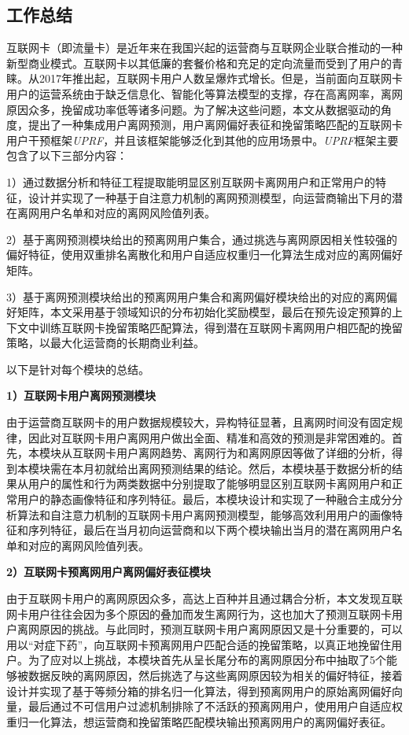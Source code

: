 \subsection{工作总结}
互联网卡（即流量卡）是近年来在我国兴起的运营商与互联网企业联合推动的一种新型商业模式。互联网卡以其低廉的套餐价格和充足的定向流量而受到了用户的青睐。从2017年推出起，互联网卡用户人数呈爆炸式增长。但是，当前面向互联网卡用户的运营系统由于缺乏信息化、智能化等算法模型的支撑，存在高离网率，离网原因众多，挽留成功率低等诸多问题。为了解决这些问题，本文从数据驱动的角度，提出了一种集成用户离网预测，用户离网偏好表征和挽留策略匹配的互联网卡用户干预框架\emph{UPRF}，并且该框架能够泛化到其他的应用场景中。\emph{UPRF}框架主要包含了以下三部分内容：\par
1）通过数据分析和特征工程提取能明显区别互联网卡离网用户和正常用户的特征，设计并实现了一种基于自注意力机制的离网预测模型，向运营商输出下月的潜在离网用户名单和对应的离网风险值列表。\par
2）基于离网预测模块给出的预离网用户集合，通过挑选与离网原因相关性较强的偏好特征，使用双重排名离散化和用户自适应权重归一化算法生成对应的离网偏好矩阵。\par
3）基于离网预测模块给出的预离网用户集合和离网偏好模块给出的对应的离网偏好矩阵，本文采用基于领域知识的分布初始化奖励模型，最后在预先设定预算的上下文中训练互联网卡挽留策略匹配算法，得到潜在互联网卡离网用户相匹配的挽留策略，以最大化运营商的长期商业利益。\par
以下是针对每个模块的总结。\par
\textbf{1）互联网卡用户离网预测模块}\par
由于运营商互联网卡的用户数据规模较大，异构特征显著，且离网时间没有固定规律，因此对互联网卡用户离网用户做出全面、精准和高效的预测是非常困难的。首先，本模块从互联网卡用户离网趋势、离网行为和离网原因等做了详细的分析，得到本模块需在本月初就给出离网预测结果的结论。然后，本模块基于数据分析的结果从用户的属性和行为两类数据中分别提取了能够明显区别互联网卡离网用户和正常用户的静态画像特征和序列特征。最后，本模块设计和实现了一种融合主成分分析算法和自注意力机制的互联网卡用户离网预测模型，能够高效利用用户的画像特征和序列特征，最后在当月初向运营商和以下两个模块输出当月的潜在离网用户名单和对应的离网风险值列表。\par

\textbf{2）互联网卡预离网用户离网偏好表征模块}\par
由于互联网卡用户的离网原因众多，高达上百种并且通过耦合分析，本文发现互联网卡用户往往会因为多个原因的叠加而发生离网行为，这也加大了预测互联网卡用户离网原因的挑战。与此同时，预测互联网卡用户离网原因又是十分重要的，可以用以“对症下药”，向互联网卡预离网用户匹配合适的挽留策略，以真正地挽留住用户。为了应对以上挑战，本模块首先从呈长尾分布的离网原因分布中抽取了5个能够被数据反映的离网原因，然后挑选了与这些离网原因较为相关的偏好特征，接着设计并实现了基于等频分箱的排名归一化算法，得到预离网用户的原始离网偏好向量，最后通过不可信用户过滤机制排除了不活跃的预离网用户，使用用户自适应权重归一化算法，想运营商和挽留策略匹配模块输出预离网用户的离网偏好表征。\par

